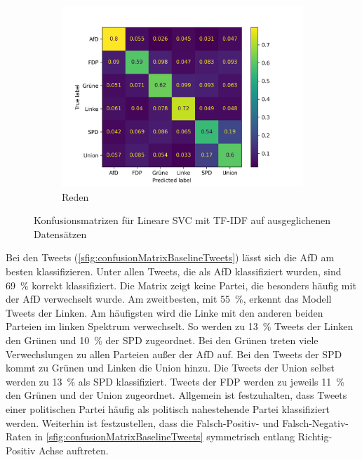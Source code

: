 \begin{figure}[H]
    \hfill
    \begin{subfigure}{0.49\textwidth}
        \includegraphics[width=\textwidth]{data/images/modeling/baseline/under/speeches_confusion_matrix.png}
        \caption{Reden}
        \label{sfig:confusionMatrixBaselineSpeeches}
    \end{subfigure}
    \caption{Konfusionsmatrizen für Lineare \acs{SVC} mit \acs{TF-IDF} auf ausgeglichenen Datensätzen} \label{fig:confusionMatrixBaseline}
\end{figure}

Bei den Tweets (\autoref{sfig:confusionMatrixBaselineTweets}) lässt sich die \ac{AfD} am besten klassifizieren. Unter allen Tweets, die als \ac{AfD} klassifiziert wurden, sind \SI{69}{\percent} korrekt klassifiziert. Die Matrix zeigt keine Partei, die besonders häufig mit der \ac{AfD} verwechselt wurde. Am zweitbesten, mit \SI{55}{\percent}, erkennt das Modell Tweets der Linken. Am häufigsten wird die Linke mit den anderen beiden Parteien im linken Spektrum verwechselt. So werden zu \SI{13}{\percent} Tweets der Linken den Grünen und \SI{10}{\percent} der \ac{SPD} zugeordnet. Bei den Grünen treten viele Verwechslungen zu allen Parteien außer der \ac{AfD} auf. Bei den Tweets der \ac{SPD} kommt zu Grünen und Linken die Union hinzu. Die Tweets der Union selbst werden zu \SI{13}{\percent} als \ac{SPD} klassifiziert. Tweets der \ac{FDP} werden zu jeweils \SI{11}{\percent} den Grünen und der Union zugeordnet. Allgemein ist festzuhalten, dass Tweets einer politischen Partei häufig als politisch nahestehende Partei klassifiziert werden. Weiterhin ist festzustellen, dass die Falsch-Positiv- und Falsch-Negativ-Raten in \autoref{sfig:confusionMatrixBaselineTweets} symmetrisch entlang Richtig-Positiv Achse auftreten.

